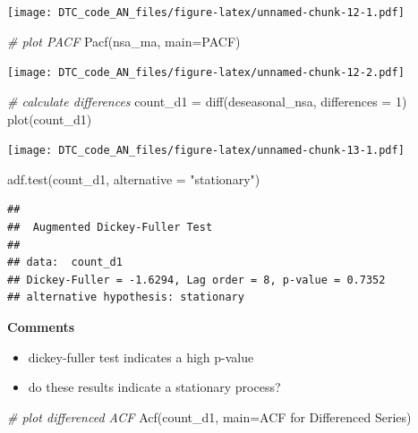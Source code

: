 \documentclass[
]{article}
\newenvironment{Shaded}{\begin{snugshade}}{\end{snugshade}}
\newcommand{\AttributeTok}[1]{\textcolor[rgb]{0.77,0.63,0.00}{#1}}
\newcommand{\CommentTok}[1]{\textcolor[rgb]{0.56,0.35,0.01}{\textit{#1}}}
\newcommand{\DecValTok}[1]{\textcolor[rgb]{0.00,0.00,0.81}{#1}}
\newcommand{\FunctionTok}[1]{\textcolor[rgb]{0.00,0.00,0.00}{#1}}
\newcommand{\NormalTok}[1]{#1}
\newcommand{\OtherTok}[1]{\textcolor[rgb]{0.56,0.35,0.01}{#1}}
\newcommand{\StringTok}[1]{\textcolor[rgb]{0.31,0.60,0.02}{#1}}
\providecommand{\tightlist}{%
  \setlength{\itemsep}{0pt}\setlength{\parskip}{0pt}}
\begin{document}
\texttt{[image: DTC\_code\_AN\_files/figure-latex/unnamed-chunk-12-1.pdf]}

\begin{Shaded}
\begin{Highlighting}[]
\CommentTok{\# plot PACF}
\FunctionTok{Pacf}\NormalTok{(nsa\_ma, }\AttributeTok{main=}\StringTok{\textquotesingle{}PACF\textquotesingle{}}\NormalTok{)}
\end{Highlighting}
\end{Shaded}

\texttt{[image: DTC\_code\_AN\_files/figure-latex/unnamed-chunk-12-2.pdf]}

\begin{Shaded}
\begin{Highlighting}[]
\CommentTok{\# calculate differences}
\NormalTok{count\_d1 }\OtherTok{=} \FunctionTok{diff}\NormalTok{(deseasonal\_nsa, }\AttributeTok{differences =} \DecValTok{1}\NormalTok{)}
\FunctionTok{plot}\NormalTok{(count\_d1)}
\end{Highlighting}
\end{Shaded}

\texttt{[image: DTC\_code\_AN\_files/figure-latex/unnamed-chunk-13-1.pdf]}

\begin{Shaded}
\begin{Highlighting}[]
\FunctionTok{adf.test}\NormalTok{(count\_d1, }\AttributeTok{alternative =} \StringTok{"stationary"}\NormalTok{)}
\end{Highlighting}
\end{Shaded}

\begin{verbatim}
## 
##  Augmented Dickey-Fuller Test
## 
## data:  count_d1
## Dickey-Fuller = -1.6294, Lag order = 8, p-value = 0.7352
## alternative hypothesis: stationary
\end{verbatim}

\textbf{Comments}

\begin{itemize}
\tightlist
\item
  dickey-fuller test indicates a high p-value
\item
  do these results indicate a stationary process?
\end{itemize}

\begin{Shaded}
\begin{Highlighting}[]
\CommentTok{\# plot differenced ACF }
\FunctionTok{Acf}\NormalTok{(count\_d1, }\AttributeTok{main=}\StringTok{\textquotesingle{}ACF for Differenced Series\textquotesingle{}}\NormalTok{)}
\end{Highlighting}
\end{Shaded}
\end{document}
